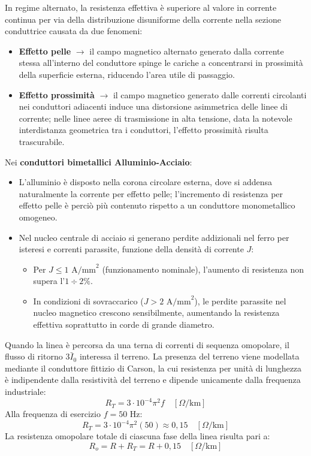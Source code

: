In regime alternato, la resistenza effettiva è superiore al valore in corrente continua per via della distribuzione disuniforme della corrente nella sezione conduttrice causata da due fenomeni:
\begin{itemize}
    \item \textbf{Effetto pelle} $\rightarrow$ il campo magnetico alternato generato dalla corrente stessa all'interno del conduttore spinge le cariche a concentrarsi in prossimità della superficie esterna, riducendo l'area utile di passaggio.
    \item \textbf{Effetto prossimità} $\rightarrow$ il campo magnetico generato dalle correnti circolanti nei conduttori adiacenti induce una distorsione asimmetrica delle linee di corrente; nelle linee aeree di trasmissione in alta tensione, data la notevole interdistanza geometrica tra i conduttori, l'effetto prossimità risulta trascurabile.
\end{itemize}

Nei \textbf{conduttori bimetallici Alluminio-Acciaio}:
\begin{itemize}
    \item L'alluminio è disposto nella corona circolare esterna, dove si addensa naturalmente la corrente per effetto pelle; l'incremento di resistenza per effetto pelle è perciò più contenuto rispetto a un conduttore monometallico omogeneo.
    \item Nel nucleo centrale di acciaio si generano perdite addizionali nel ferro per isteresi e correnti parassite, funzione della densità di corrente $J$:
    \begin{itemize}
        \item Per $J \le 1\text{ A/mm}^2$ (funzionamento nominale), l'aumento di resistenza non supera l'$1 \div 2\%$.
        \item In condizioni di sovraccarico ($J > 2\text{ A/mm}^2$), le perdite parassite nel nucleo magnetico crescono sensibilmente, aumentando la resistenza effettiva soprattutto in corde di grande diametro.
    \end{itemize}
\end{itemize}

Quando la linea è percorsa da una terna di correnti di sequenza omopolare, il flusso di ritorno $3\bar{I}_0$ interessa il terreno. La presenza del terreno viene modellata mediante il conduttore fittizio di Carson, la cui resistenza per unità di lunghezza è indipendente dalla resistività del terreno e dipende unicamente dalla frequenza industriale:
\[R_T = 3 \cdot 10^{-4} \pi^2 f \quad [\Omega/\text{km}]\]
Alla frequenza di esercizio $f = 50\text{ Hz}$:
\[R_T = 3 \cdot 10^{-4} \pi^2 (50) \approx 0{,}15 \quad [\Omega/\text{km}]\]
La resistenza omopolare totale di ciascuna fase della linea risulta pari a:
\[R_o = R + R_T = R + 0{,}15 \quad [\Omega/\text{km}]\]

